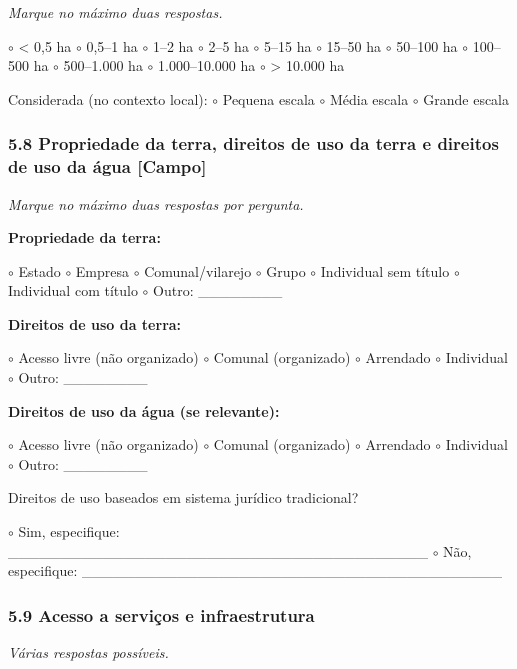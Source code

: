 \emph{Marque no máximo duas respostas.}

$\circ$ \textless{} 0,5 ha $\circ$ 0,5--1 ha $\circ$ 1--2 ha $\circ$ 2--5 ha $\circ$ 5--15 ha $\circ$ 15--50 ha $\circ$ 50--100 ha $\circ$ 100--500 ha $\circ$ 500--1.000 ha $\circ$ 1.000--10.000 ha $\circ$ \textgreater{} 10.000 ha

Considerada (no contexto local): $\circ$ Pequena escala $\circ$ Média escala $\circ$ Grande escala

\subsubsection{5.8 Propriedade da terra, direitos de uso da terra e direitos de uso da água {[Campo]}}\label{propriedade-da-terra-direitos-de-uso-da-terra-e-direitos-de-uso-da-uxe1gua}

\emph{Marque no máximo duas respostas por pergunta.}

\textbf{Propriedade da terra:}

$\circ$ Estado $\circ$ Empresa $\circ$ Comunal/vilarejo $\circ$ Grupo $\circ$ Individual sem título $\circ$ Individual com título $\circ$ Outro: \_\_\_\_\_\_\_\_

\textbf{Direitos de uso da terra:}

$\circ$ Acesso livre (não organizado) $\circ$ Comunal (organizado) $\circ$ Arrendado $\circ$ Individual $\circ$ Outro: \_\_\_\_\_\_\_\_

\textbf{Direitos de uso da água (se relevante):}

$\circ$ Acesso livre (não organizado) $\circ$ Comunal (organizado) $\circ$ Arrendado $\circ$ Individual $\circ$ Outro: \_\_\_\_\_\_\_\_

Direitos de uso baseados em sistema jurídico tradicional?

$\circ$ Sim, especifique: \_\_\_\_\_\_\_\_\_\_\_\_\_\_\_\_\_\_\_\_\_\_\_\_\_\_\_\_\_\_\_\_\_\_\_\_\_\_\_\_ $\circ$ Não, especifique: \_\_\_\_\_\_\_\_\_\_\_\_\_\_\_\_\_\_\_\_\_\_\_\_\_\_\_\_\_\_\_\_\_\_\_\_\_\_\_\_

\subsubsection{5.9 Acesso a serviços e infraestrutura}\label{acesso-a-serviuxe7os-e-infraestrutura}

\emph{Várias respostas possíveis.}

